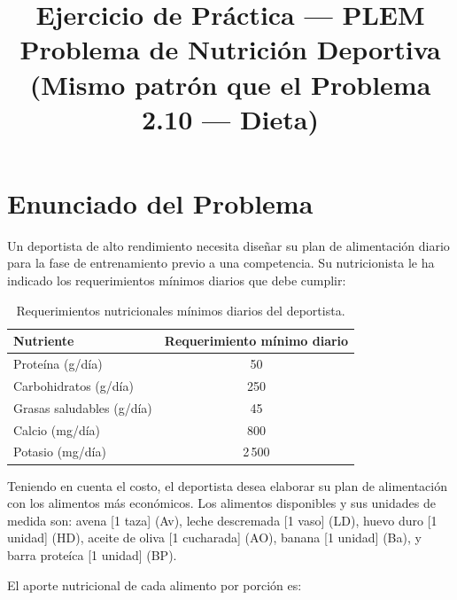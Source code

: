 \documentclass[12pt]{article}
\title{\textbf{Ejercicio de Pr\'actica --- PLEM} \\[0.5em]
\large Problema de Nutrici\'on Deportiva \\[0.3em]
\normalsize (Mismo patr\'on que el Problema 2.10 --- Dieta)}
\author{}
\date{}
\begin{document}
\maketitle
\tableofcontents
\newpage

\section{Enunciado del Problema}

Un deportista de alto rendimiento necesita dise\~nar su plan de alimentaci\'on diario para la fase de entrenamiento previo a una competencia. Su nutricionista le ha indicado los requerimientos m\'inimos diarios que debe cumplir:

\begin{table}[h]
\centering
\begin{tabular}{lc}
\toprule
\textbf{Nutriente} & \textbf{Requerimiento m\'inimo diario} \\
\midrule
Prote\'ina (g/d\'ia)      & 50   \\
Carbohidratos (g/d\'ia)   & 250  \\
Grasas saludables (g/d\'ia) & 45 \\
Calcio (mg/d\'ia)          & 800  \\
Potasio (mg/d\'ia)         & 2\,500 \\
\bottomrule
\end{tabular}
\caption{Requerimientos nutricionales m\'inimos diarios del deportista.}
\end{table}

Teniendo en cuenta el costo, el deportista desea elaborar su plan de alimentaci\'on con los alimentos m\'as econ\'omicos. Los alimentos disponibles y sus unidades de medida son: avena [1 taza] (Av), leche descremada [1 vaso] (LD), huevo duro [1 unidad] (HD), aceite de oliva [1 cucharada] (AO), banana [1 unidad] (Ba), y barra prote\'ica [1 unidad] (BP).

El aporte nutricional de cada alimento por porci\'on es:
\end{document}
